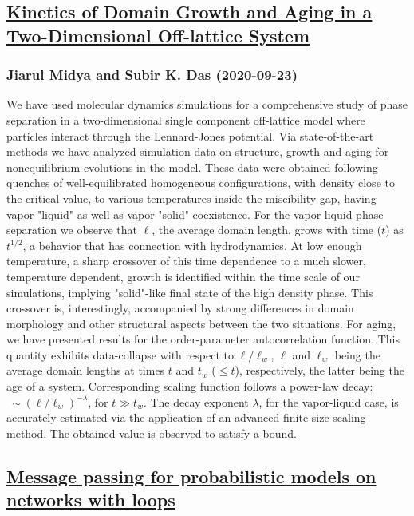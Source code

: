 \subsection*{\href{http://arxiv.org/abs/2009.11202v1}{Kinetics of Domain Growth and Aging in a Two-Dimensional Off-lattice  System}}
\subsubsection*{Jiarul Midya and Subir K. Das (2020-09-23)}
We have used molecular dynamics simulations for a comprehensive study of
phase separation in a two-dimensional single component off-lattice model where
particles interact through the Lennard-Jones potential. Via state-of-the-art
methods we have analyzed simulation data on structure, growth and aging for
nonequilibrium evolutions in the model. These data were obtained following
quenches of well-equilibrated homogeneous configurations, with density close to
the critical value, to various temperatures inside the miscibility gap, having
vapor-"liquid" as well as vapor-"solid" coexistence. For the vapor-liquid phase
separation we observe that $\ell$, the average domain length, grows with time
($t$) as $t^{1/2}$, a behavior that has connection with hydrodynamics. At low
enough temperature, a sharp crossover of this time dependence to a much slower,
temperature dependent, growth is identified within the time scale of our
simulations, implying "solid"-like final state of the high density phase. This
crossover is, interestingly, accompanied by strong differences in domain
morphology and other structural aspects between the two situations. For aging,
we have presented results for the order-parameter autocorrelation function.
This quantity exhibits data-collapse with respect to $\ell/\ell_w$, $\ell$ and
$\ell_w$ being the average domain lengths at times $t$ and $t_w$ ($\leq t$),
respectively, the latter being the age of a system. Corresponding scaling
function follows a power-law decay: $~\sim (\ell/\ell_w)^{-\lambda}$, for $t\gg
t_w$. The decay exponent $\lambda$, for the vapor-liquid case, is accurately
estimated via the application of an advanced finite-size scaling method. The
obtained value is observed to satisfy a bound.

\subsection*{\href{http://arxiv.org/abs/2009.12246v1}{Message passing for probabilistic models on networks with loops}}
